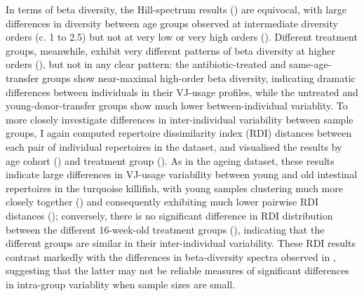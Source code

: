 In terms of beta diversity, the Hill-spectrum results () are equivocal, with large differences in diversity between age groups observed at intermediate diversity orders (c. 1 to 2.5) but not at very low or very high orders (). Different treatment groups, meanwhile, exhibit very different patterns of beta diversity at higher orders (), but not in any clear pattern: the antibiotic-treated and same-age-transfer groups show near-maximal high-order beta diversity, indicating dramatic differences between individuals in their VJ-usage profiles, while the untreated and young-donor-transfer groups show much lower between-individual variablity. To more closely investigate differences in inter-individual variability between sample groups, I again computed repertoire dissimilarity index (RDI) distances between each pair of individual repertoires in the dataset, and visualised the results by age cohort () and treatment group (). As in the ageing dataset, these results indicate large differences in VJ-usage variability between young and old intestinal repertoires in the turquoise killifish, with young samples clustering much more closely together () and consequently exhibiting much lower pairwise RDI distances (); conversely, there is no significant difference in RDI distribution between the different 16-week-old treatment groups (), indicating that the different groups are similar in their inter-individual variability. These RDI results contrast markedly with the differences in beta-diversity spectra observed in , suggesting that the latter may not be reliable measures of significant differences in intra-group variablity when sample sizes are small.

